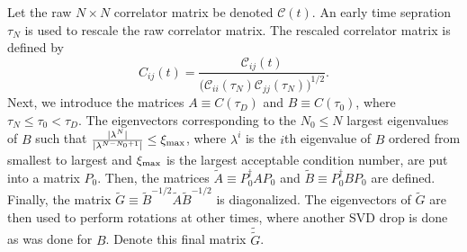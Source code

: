 \documentclass[12pt,letterpaper,notitlepage]{article}
\begin{document}
Let the raw $N \times N$ correlator matrix be denoted $\mathcal{C}(t)$.
An early time sepration $\tau_N$ is used to rescale the raw correlator matrix.
The rescaled correlator matrix is defined by
\begin{equation}
  C_{ij} (t) = \frac{\mathcal{C}_{ij} (t)}{\big(\mathcal{C}_{ii} (\tau_N) \mathcal{C}_{jj} (\tau_N)\big)^{1/2}} .
\end{equation}
Next, we introduce the matrices $A \equiv C(\tau_D)$ and $B \equiv C(\tau_0)$, where $\tau_N \leq \tau_0 < \tau_D$.
The eigenvectors corresponding to the $N_0 \leq N$ largest eigenvalues of $B$ such that $\frac{|\lambda^{N}|}{|\lambda^{N-N_0+1}|} \leq \xi_{\rm max}$,
where $\lambda^i$ is the $i$th eigenvalue of $B$ ordered from smallest to largest and $\xi_{\rm max}$ is the largest acceptable condition number, are put into a matrix $P_0$.
Then, the matrices $\widetilde{A} \equiv P_0^\dagger A P_0$ and $\widetilde{B} \equiv P_0^\dagger B P_0$ are defined.
Finally, the matrix $\widetilde{G} \equiv \widetilde{B}^{-1/2} \widetilde{A} \widetilde{B}^{-1/2}$ is diagonalized.
The eigenvectors of $\widetilde{G}$ are then used to perform rotations at other times, where another SVD drop is done as was done for $B$.
Denote this final matrix $\widetilde{\widetilde{G}}$.
\end{document}
